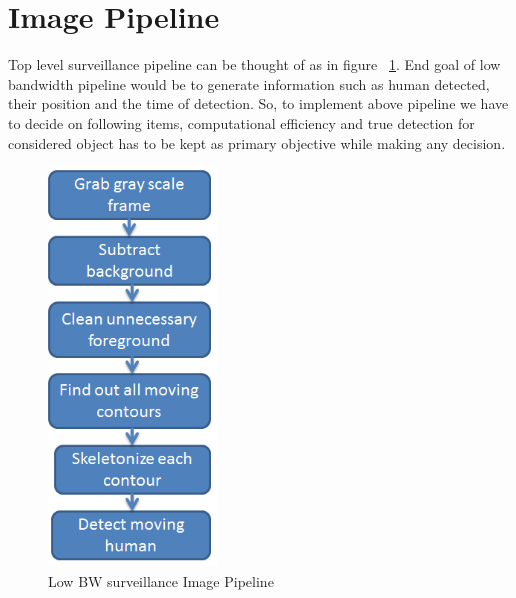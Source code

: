 \pagebreak

\section{Image Pipeline}


\indent Top level surveillance pipeline can be thought of as in figure
~\ref{image_pipeline}.  End goal of low bandwidth pipeline would be to
generate information such as human detected, their position and the time
of detection. So, to implement above pipeline we have to decide on
following items, computational efficiency and true detection for
considered object has to be kept as primary objective while making any
decision.

\begin{figure}[!t]
\centering
\includegraphics[height=300pt]{Figures/image_pipeline}
\caption{Low BW surveillance Image Pipeline}
\label{image_pipeline}
\end{figure}

